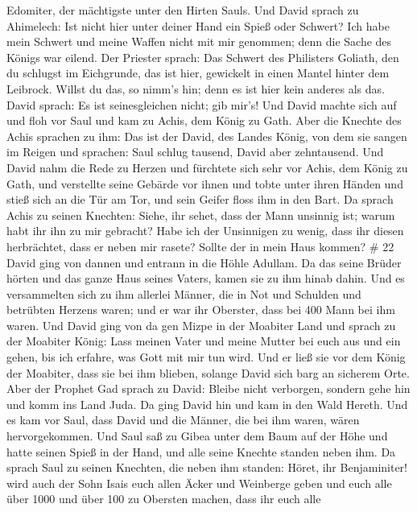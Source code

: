Edomiter, der mächtigste unter den Hirten Sauls.  Und David
sprach zu Ahimelech: Ist nicht hier unter deiner Hand ein Spieß oder
Schwert? Ich habe mein Schwert und meine Waffen nicht mit mir genommen;
denn die Sache des Königs war eilend.  Der Priester sprach:
Das Schwert des Philisters Goliath, den du schlugst im Eichgrunde, das
ist hier, gewickelt in einen Mantel hinter dem Leibrock. Willst du das,
so nimm's hin; denn es ist hier kein anderes als das. David sprach: Es
ist seinesgleichen nicht; gib mir's!  Und David machte sich
auf und floh vor Saul und kam zu Achis, dem König zu Gath. 
Aber die Knechte des Achis sprachen zu ihm: Das ist der David, des
Landes König, von dem sie sangen im Reigen und sprachen: Saul schlug
tausend, David aber zehntausend.  Und David nahm die Rede
zu Herzen und fürchtete sich sehr vor Achis, dem König zu Gath,
 und verstellte seine Gebärde vor ihnen und tobte unter
ihren Händen und stieß sich an die Tür am Tor, und sein Geifer floss ihm
in den Bart.  Da sprach Achis zu seinen Knechten: Siehe,
ihr sehet, dass der Mann unsinnig ist; warum habt ihr ihn zu mir
gebracht?  Habe ich der Unsinnigen zu wenig, dass ihr
diesen herbrächtet, dass er neben mir rasete? Sollte der in mein Haus
kommen? \# 22  David ging von dannen und entrann in die
Höhle Adullam. Da das seine Brüder hörten und das ganze Haus seines
Vaters, kamen sie zu ihm hinab dahin.  Und es versammelten
sich zu ihm allerlei Männer, die in Not und Schulden und betrübten
Herzens waren; und er war ihr Oberster, dass bei 400 Mann bei ihm waren.
 Und David ging von da gen Mizpe in der Moabiter Land und
sprach zu der Moabiter König: Lass meinen Vater und meine Mutter bei
euch aus und ein gehen, bis ich erfahre, was Gott mit mir tun wird.
 Und er ließ sie vor dem König der Moabiter, dass sie bei
ihm blieben, solange David sich barg an sicherem Orte.  Aber
der Prophet Gad sprach zu David: Bleibe nicht verborgen, sondern gehe
hin und komm ins Land Juda. Da ging David hin und kam in den Wald
Hereth.  Und es kam vor Saul, dass David und die Männer, die
bei ihm waren, wären hervorgekommen. Und Saul saß zu Gibea unter dem
Baum auf der Höhe und hatte seinen Spieß in der Hand, und alle seine
Knechte standen neben ihm.  Da sprach Saul zu seinen
Knechten, die neben ihm standen: Höret, ihr Benjaminiter! wird auch der
Sohn Isais euch allen Äcker und Weinberge geben und euch alle über 1000
und über 100 zu Obersten machen,  dass ihr euch alle
